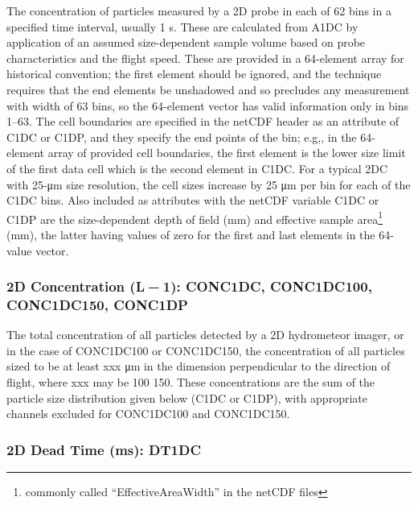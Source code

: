 \documentclass[
  english,
]{book}
\begin{document}
The concentration of particles measured by a 2D probe in each of 62 bins in a specified time interval, usually 1 s. These are calculated from A1DC by application of an assumed size-dependent sample volume based on probe characteristics and the flight speed. These are provided in a 64-element array for historical convention; the first element should be ignored, and the technique requires that the end elements be unshadowed and so precludes any measurement with width of 63 bins, so the 64-element vector has valid information only in bins 1--63. The cell boundaries are specified in the netCDF header as an attribute of C1DC or C1DP, and they specify the end points of the bin; e.g,, in the 64-element array of provided cell boundaries, the first element is the lower size limit of the first data cell which is the second element in C1DC. For a typical 2DC with 25-{μ}m size resolution, the cell sizes increase by 25 {μ}m per bin for each of the C1DC bins. Also included as attributes with the netCDF variable C1DC or C1DP are the size-dependent depth of field (mm) and effective sample area\footnote{commonly called ``EffectiveAreaWidth'' in the netCDF files}
(mm), the latter having values of zero for the first and last elements in the 64-value vector.

\hypertarget{conc2d}{%
\subsubsection*{\texorpdfstring{2D Concentration (L{ − 1}): CONC1DC, CONC1DC100, CONC1DC150, CONC1DP}{2D Concentration (L − 1): CONC1DC, CONC1DC100, CONC1DC150, CONC1DP}}\label{conc2d}}

The total concentration of all particles detected by a 2D hydrometeor imager, or in the case of CONC1DC100 or CONC1DC150, the concentration of all particles sized to be at least xxx {μ}m in the dimension perpendicular to the direction of flight, where xxx may be 100 150. These concentrations are the sum of the particle size distribution given below (C1DC or C1DP), with appropriate channels excluded for CONC1DC100 and CONC1DC150.

\hypertarget{dt1dc}{%
\subsubsection*{2D Dead Time (ms): DT1DC}\label{dt1dc}}
\end{document}
